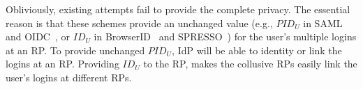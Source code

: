 Obliviously, existing attempts fail to provide the complete  privacy.
The essential reason is that these schemes provide an unchanged value (e.g., $PID_{U}$ in SAML~\cite{SAMLIdentifier} and OIDC~\cite{OpenIDConnect}, or $ID_U$ in BrowserID~\cite{BrowserID} and SPRESSO~\cite{SPRESSO}) for the user's multiple logins at an RP.
To provide unchanged $PID_{U}$, IdP will be able to identity or link the logins at an RP.
Providing $ID_U$ to the RP, makes  the collusive RPs easily link the user's logins at different RPs.


